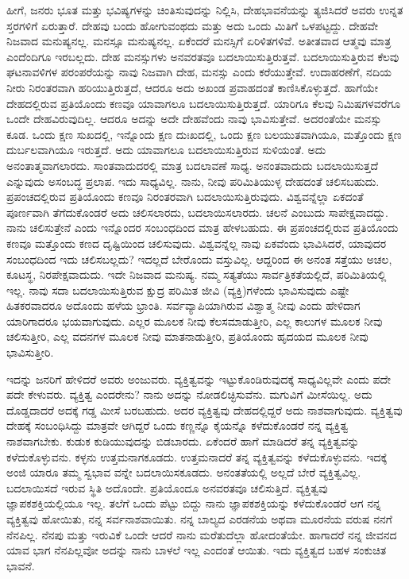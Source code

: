 
ಹೀಗೆ, ಜನರು ಭೂತ ಮತ್ತು ಭವಿಷ್ಯಗಳನ್ನು ಚಿಂತಿಸುವುದನ್ನು ನಿಲ್ಲಿಸಿ, ದೇಹಭಾವನೆಯನ್ನು ತ್ಯಜಿಸಿದರೆ ಅವರು ಉನ್ನತ ಸ್ತರಗಳಿಗೆ ಏರುತ್ತಾರೆ. ದೇಹವು ಬಂದು ಹೋಗುವಂಥದು ಮತ್ತು ಅದು ಒಂದು ಮಿತಿಗೆ ಒಳಪಟ್ಟದ್ದು. ದೇಹವೇ ನಿಜವಾದ ಮನುಷ್ಯನಲ್ಲ. ಮನಸ್ಸೂ ಮನುಷ್ಯನಲ್ಲ. ಏಕೆಂದರೆ ಮನಸ್ಸಿಗೆ ಏರಿಳಿತಗಳಿವೆ. ಅತೀತವಾದ ಆತ್ಮವು ಮಾತ್ರ ಎಂದೆಂದಿಗೂ ಇರಬಲ್ಲದು. ದೇಹ ಮನಸ್ಸುಗಳು ಅನವರತವೂ ಬದಲಾಯಿಸುತ್ತಿರುತ್ತವೆ. ಬದಲಾಯಿಸುತ್ತಿರುವ ಕೆಲವು ಘಟನಾವಳಿಗಳ ಪರಂಪರೆಯನ್ನು ನಾವು ನಿಜವಾಗಿ ದೇಹ, ಮನಸ್ಸು ಎಂದು ಕರೆಯುತ್ತೇವೆ. ಉದಾಹರಣೆಗೆ, ನದಿಯ ನೀರು ನಿರಂತರವಾಗಿ ಹರಿಯುತ್ತಿರುತ್ತದೆ, ಆದರೂ ಅದು ಅಖಂಡ ಪ್ರವಾಹದಂತೆ ಕಾಣಿಸಿಕೊಳ್ಳುತ್ತದೆ. ಹಾಗೆಯೇ ದೇಹದಲ್ಲಿರುವ ಪ್ರತಿಯೊಂದು ಕಣವೂ ಯಾವಾಗಲೂ ಬದಲಾಯಿಸುತ್ತಿರುತ್ತದೆ. ಯಾರಿಗೂ ಕೆಲವು ನಿಮಿಷಗಳವರೆಗೂ ಒಂದೇ ದೇಹವಿರುವುದಿಲ್ಲ. ಆದರೂ ಅದನ್ನು ಅದೇ ದೇಹವೆಂದು ನಾವು ಭಾವಿಸುತ್ತೇವೆ. ಅದರಂತೆಯೇ ಮನಸ್ಸು ಕೂಡ. ಒಂದು ಕ್ಷಣ ಸುಖದಲ್ಲಿ, ಇನ್ನೊಂದು ಕ್ಷಣ ದುಃಖದಲ್ಲಿ, ಒಂದು ಕ್ಷಣ ಬಲಯುತವಾಗಿಯೂ, ಮತ್ತೊಂದು ಕ್ಷಣ ದುರ್ಬಲವಾಗಿಯೂ ಇರುತ್ತದೆ. ಅದು ಯಾವಾಗಲೂ ಬದಲಾಯಿಸುತ್ತಿರುವ ಸುಳಿಯಂತೆ. ಅದು ಅನಂತಾತ್ಮವಾಗಲಾರದು. ಸಾಂತವಾದುದರಲ್ಲಿ ಮಾತ್ರ ಬದಲಾವಣೆ ಸಾಧ್ಯ. ಅನಂತವಾದುದು ಬದಲಾಯಿಸುತ್ತದೆ ಎನ್ನುವುದು ಅಸಂಬದ್ಧ ಪ್ರಲಾಪ. ಇದು ಸಾಧ್ಯವಿಲ್ಲ. ನಾನು, ನೀವು ಪರಿಮಿತಿಯುಳ್ಳ ದೇಹದಂತೆ ಚಲಿಸಬಹುದು. ಪ್ರಪಂಚದಲ್ಲಿರುವ ಪ್ರತಿಯೊಂದು ಕಣವೂ ನಿರಂತರವಾಗಿ ಬದಲಾಯಿಸುತ್ತಿರುವುದು. ವಿಶ್ವವನ್ನೆಲ್ಲಾ ಏಕದಂತೆ ಪೂರ್ಣವಾಗಿ ತೆಗೆದುಕೊಂಡರೆ ಅದು ಚಲಿಸಲಾರದು, ಬದಲಾಯಿಸಲಾರದು. ಚಲನೆ ಎಂಬುದು ಸಾಪೇಕ್ಷವಾದದ್ದು. ನಾನು ಚಲಿಸುತ್ತೇನೆ ಎಂದು ಇನ್ನೊಂದರ ಸಂಬಂಧದಿಂದ ಮಾತ್ರ ಹೇಳಬಹುದು. ಈ ಪ್ರಪಂಚದಲ್ಲಿರುವ ಪ್ರತಿಯೊಂದು ಕಣವೂ ಮತ್ತೊಂದು ಕಣದ ದೃಷ್ಟಿಯಿಂದ ಚಲಿಸುವುದು. ವಿಶ್ವವನ್ನೆಲ್ಲ ನಾವು ಏಕವೆಂದು ಭಾವಿಸಿದರೆ, ಯಾವುದರ ಸಂಬಂಧದಿಂದ ಇದು ಚಲಿಸಬಲ್ಲದು? ಇದಲ್ಲದೆ ಬೇರೊಂದು ವಸ್ತುವಿಲ್ಲ. ಆದ್ದರಿಂದ ಈ ಅನಂತ ಸತ್ತೆಯು ಅಚಲ, ಕೂಟಸ್ಥ, ನಿರಪೇಕ್ಷವಾದುದು. ಇದೇ ನಿಜವಾದ ಮನುಷ್ಯ. ನಮ್ಮ ಸತ್ಯತೆಯು ಸಾರ್ವತ್ರಿಕತೆಯಲ್ಲಿದೆ, ಪರಿಮಿತಿಯಲ್ಲಿ ಇಲ್ಲ. ನಾವು ಸದಾ ಬದಲಾಯಿಸುತ್ತಿರುವ ಕ್ಷುದ್ರ ಪರಿಮಿತ ಜೀವಿ (ವ್ಯಕ್ತಿ)ಗಳೆಂದು ಭಾವಿಸುವುದು ಎಷ್ಟೇ ಹಿತಕರವಾದರೂ ಅದೊಂದು ಹಳೆಯ ಭ್ರಾಂತಿ. ಸರ್ವವ್ಯಾಪಿಯಾಗಿರುವ ವಿಶ್ವಾತ್ಮ ನೀವು ಎಂದು ಹೇಳಿದಾಗ ಯಾರಿಗಾದರೂ ಭಯವಾಗುವುದು. ಎಲ್ಲರ ಮೂಲಕ ನೀವು ಕೆಲಸಮಾಡುತ್ತೀರಿ, ಎಲ್ಲ ಕಾಲುಗಳ ಮೂಲಕ ನೀವು ಚಲಿಸುತ್ತೀರಿ, ಎಲ್ಲ ವದನಗಳ ಮೂಲಕ ನೀವು ಮಾತನಾಡುತ್ತೀರಿ, ಪ್ರತಿಯೊಂದು ಹೃದಯದ ಮೂಲಕ ನೀವು ಭಾವಿಸುತ್ತೀರಿ.


ಇದನ್ನು ಜನರಿಗೆ ಹೇಳಿದರೆ ಅವರು ಅಂಜುವರು. ವ್ಯಕ್ತಿತ್ವವನ್ನು ಇಟ್ಟುಕೊಂಡಿರುವುದಕ್ಕೆ ಸಾಧ್ಯವಿಲ್ಲವೇ ಎಂದು ಪದೇ ಪದೇ ಕೇಳುವರು. ವ್ಯಕ್ತಿತ್ವ ಎಂದರೇನು? ನಾನು ಅದನ್ನು ನೋಡಲಿಚ್ಛಿಸುವೆನು. ಮಗುವಿಗೆ ಮೀಸೆಯಿಲ್ಲ. ಅದು ದೊಡ್ಡದಾದರೆ ಅದಕ್ಕೆ ಗಡ್ಡ ಮೀಸೆ ಬರಬಹುದು. ಅದರ ವ್ಯಕ್ತಿತ್ವವು ದೇಹದಲ್ಲಿದ್ದರೆ ಅದು ನಾಶವಾಗುವುದು. ವ್ಯಕ್ತಿತ್ವವು ದೇಹಕ್ಕೆ ಸಂಬಂಧಿಸಿದ್ದು ಮಾತ್ರವೇ ಆಗಿದ್ದರೆ ಒಂದು ಕಣ್ಣನ್ನೊ ಕೈಯನ್ನೊ ಕಳೆದುಕೊಂಡರೆ ನನ್ನ ವ್ಯಕ್ತಿತ್ವ ನಾಶವಾಗಬೇಕು. ಕುಡುಕ ಕುಡಿಯುವುದನ್ನು ಬಿಡಬಾರದು. ಏಕೆಂದರೆ ಹಾಗೆ ಮಾಡಿದರೆ ತನ್ನ ವ್ಯಕ್ತಿತ್ವವನ್ನು ಕಳೆದುಕೊಳ್ಳುವನು. ಕಳ್ಳನು ಉತ್ತಮನಾಗಕೂಡದು. ಉತ್ತಮನಾದರೆ ತನ್ನ ವ್ಯಕ್ತಿತ್ವವನ್ನು ಕಳೆದುಕೊಳ್ಳುವನು. ಇದಕ್ಕೆ ಅಂಜಿ ಯಾರೂ ತಮ್ಮ ಸ್ವಭಾವ ವನ್ನೇ ಬದಲಾಯಿಸಕೂಡದು. ಅನಂತತೆಯಲ್ಲಿ ಅಲ್ಲದೆ ಬೇರೆ ವ್ಯಕ್ತಿತ್ವವಿಲ್ಲ. ಬದಲಾಯಿಸದೆ ಇರುವ ಸ್ಥಿತಿ ಅದೊಂದೇ. ಪ್ರತಿಯೊಂದೂ ಅನವರತವೂ ಚಲಿಸುತ್ತಿದೆ. ವ್ಯಕ್ತಿತ್ವವು ಜ್ಞಾಪಕಶಕ್ತಿಯಲ್ಲಿಯೂ ಇಲ್ಲ. ತಲೆಗೆ ಒಂದು ಪೆಟ್ಟು ಬಿದ್ದು ನಾನು ಜ್ಞಾಪಕಶಕ್ತಿಯನ್ನು ಕಳೆದುಕೊಂಡರೆ ಆಗ ನನ್ನ ವ್ಯಕ್ತಿತ್ವವು ಹೋಯಿತು, ನನ್ನ ಸರ್ವನಾಶವಾಯಿತು. ನನ್ನ ಬಾಲ್ಯದ ಎರಡನೆಯ ಅಥವಾ ಮೂರನೆಯ ವರುಷ ನನಗೆ ನೆನಪಿಲ್ಲ. ನೆನಪು ಮತ್ತು ಇರುವಿಕೆ ಒಂದೇ ಆದರೆ ನಾನು ಮರೆತುದೆಲ್ಲಾ ಹೋದಂತೆಯೇ. ಹಾಗಾದರೆ ನನ್ನ ಜೀವನದ ಯಾವ ಭಾಗ ನೆನಪಿಲ್ಲವೋ ಅದನ್ನು ನಾನು ಬಾಳಲೆ ಇಲ್ಲ ಎಂದಂತೆ ಆಯಿತು. ಇದು ವ್ಯಕ್ತಿತ್ವದ ಬಹಳ ಸಂಕುಚಿತ ಭಾವನೆ.

